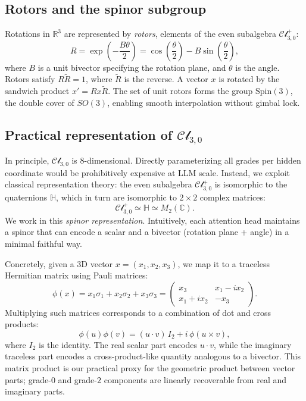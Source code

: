 \documentclass{article}
\theoremstyle{plain}
\theoremstyle{definition}
\theoremstyle{remark}
\newcommand{\cliff}{\mathcal{Cl}}
\newcommand{\R}{\mathbb{R}}
\newcommand{\C}{\mathbb{C}}
\newcommand{\Hq}{\mathbb{H}}
\begin{document}
\subsection{Rotors and the spinor subgroup}

Rotations in $\R^3$ are represented by \emph{rotors}, elements of the even subalgebra $\cliff^+_{3,0}$:
\begin{equation}
    R = \exp\left(-\frac{B\theta}{2}\right) = \cos\left(\frac{\theta}{2}\right) - B\sin\left(\frac{\theta}{2}\right),
\end{equation}
where $B$ is a unit bivector specifying the rotation plane, and $\theta$ is the angle. Rotors satisfy $R\tilde{R} = 1$, where $\tilde{R}$ is the reverse. A vector $x$ is rotated by the sandwich product $x' = R x \tilde{R}$. The set of unit rotors forms the group $\mathrm{Spin}(3)$, the double cover of $SO(3)$, enabling smooth interpolation without gimbal lock.

\subsection{Practical representation of $\cliff_{3,0}$}
\label{sec:practical_cliff}

In principle, $\cliff_{3,0}$ is $8$-dimensional. Directly parameterizing all grades per hidden coordinate would be prohibitively expensive at LLM scale. Instead, we exploit classical representation theory: the even subalgebra $\cliff^+_{3,0}$ is isomorphic to the quaternions $\Hq$, which in turn are isomorphic to $2 \times 2$ complex matrices:
\begin{equation}
    \cliff^+_{3,0} \simeq \Hq \simeq M_2(\C).
\end{equation}
We work in this \emph{spinor representation}. Intuitively, each attention head maintains a spinor that can encode a scalar and a bivector (rotation plane + angle) in a minimal faithful way.

Concretely, given a 3D vector $x = (x_1,x_2,x_3)$, we map it to a traceless Hermitian matrix using Pauli matrices:
\begin{equation}
    \phi(x) = x_1 \sigma_1 + x_2 \sigma_2 + x_3 \sigma_3
    = 
    \begin{pmatrix}
        x_3 & x_1 - i x_2\\
        x_1 + i x_2 & -x_3
    \end{pmatrix}.
\end{equation}
Multiplying such matrices corresponds to a combination of dot and cross products:
\begin{equation}
    \phi(u)\phi(v) = (u \cdot v)\,I_2 + i\,\phi(u \times v),
\end{equation}
where $I_2$ is the identity. The real scalar part encodes $u\cdot v$, while the imaginary traceless part encodes a cross-product-like quantity analogous to a bivector. This matrix product is our practical proxy for the geometric product between vector parts; grade-$0$ and grade-$2$ components are linearly recoverable from real and imaginary parts.
\end{document}
